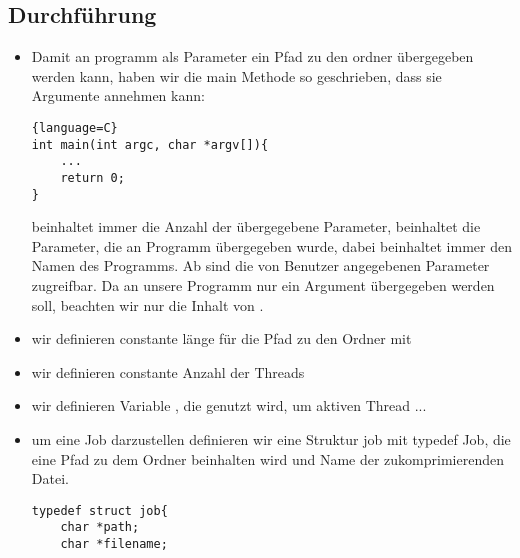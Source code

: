 	\subsection{Durchführung}
\begin{itemize}
	\item Damit an programm als Parameter ein Pfad zu den ordner übergegeben werden kann, haben wir die main
	Methode so geschrieben, dass sie Argumente annehmen kann:
\begin{lstlisting}{language=C}
int main(int argc, char *argv[]){
	...
	return 0;
}
\end{lstlisting}
	 beinhaltet immer die Anzahl der übergegebene Parameter,
	 beinhaltet die Parameter, die an Programm übergegeben wurde,
	dabei  beinhaltet immer den Namen des Programms.
	Ab  sind die von Benutzer angegebenen Parameter zugreifbar.
	Da an unsere Programm nur ein Argument übergegeben werden soll,
	beachten wir nur die Inhalt von .
	\item wir definieren constante länge für die Pfad zu den Ordner mit 
	\item wir definieren constante Anzahl der Threads 
	\item wir definieren Variable , die genutzt wird,
	um aktiven Thread ...
	\item um eine Job darzustellen definieren wir eine Struktur job mit typedef Job,
	die eine Pfad zu dem Ordner beinhalten wird und Name der zukomprimierenden Datei.
	\begin{lstlisting}
typedef struct job{
	char *path;
	char *filename;


\end{lstlisting}
\end{itemize}
